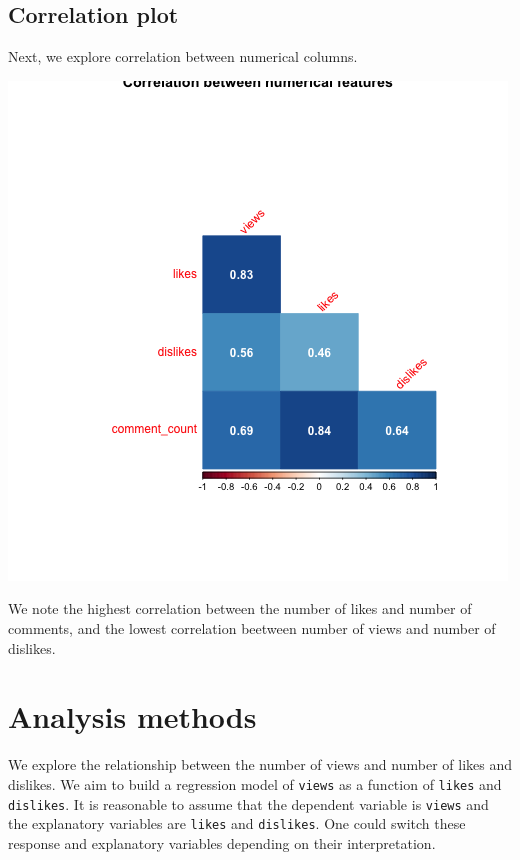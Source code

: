 \documentclass[]{article}
\begin{document}
\hypertarget{correlation-plot}{%
\subsection{Correlation plot}\label{correlation-plot}}

Next, we explore correlation between numerical columns.

\includegraphics{../images/corr_plot.png}

We note the highest correlation between the number of likes and number
of comments, and the lowest correlation beetween number of views and
number of dislikes.

\hypertarget{analysis-methods}{%
\section{Analysis methods}\label{analysis-methods}}

We explore the relationship between the number of views and number of
likes and dislikes. We aim to build a regression model of \texttt{views}
as a function of \texttt{likes} and \texttt{dislikes}. It is reasonable
to assume that the dependent variable is \texttt{views} and the
explanatory variables are \texttt{likes} and \texttt{dislikes}. One
could switch these response and explanatory variables depending on their
interpretation.
\end{document}
